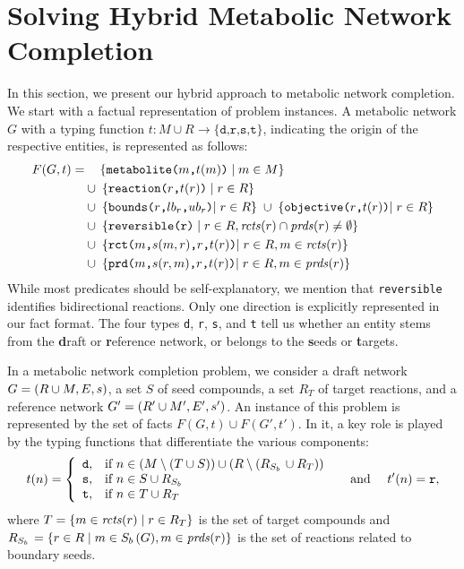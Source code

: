 
\section{Solving Hybrid Metabolic Network Completion}
\label{sec:approach}

In this section, we present our hybrid approach to metabolic network completion.
We start with a factual representation of problem instances.
%
A metabolic network $G$ with a typing function $t: M\cup R\rightarrow\{\texttt{d,r,s,t}\}$,
indicating the origin of the respective entities,
is represented as follows:
\begin{align*}
F(G,t) = & \phantom{\cup\;}\;\{\texttt{metabolite($m$,$t(m)$)}\mid m\in M\} \\
         &          \cup\;   \{\texttt{reaction($r$,$t(r)$)}\mid r\in R\}  \\
         &          \cup\;   \{\texttt{bounds($r$,$lb_r$,$ub_r$)$\mid r\in R$}\} \;\cup\; \{\texttt{objective($r$,$t(r)$)$\mid r\in R$}\}\\
         &          \cup\;   \{\texttt{reversible(r)}\mid r\in R, \mathit{rcts}(r)\cap\mathit{prds}(r)\neq\emptyset\} \\
         &          \cup\;   \{\texttt{rct($m$,$s(m,r)$,$r$,$t(r)$)$\mid r\in R, m\in\mathit{rcts}(r)$}\} \\
         &          \cup\;   \{\texttt{prd($m$,$s(r,m)$,$r$,$t(r)$)$\mid r\in R, m\in\mathit{prds}(r)$}\}
\end{align*}
%
While most predicates should be self-explanatory,
we mention that \texttt{reversible} identifies bidirectional reactions.
Only one direction is explicitly represented in our fact format.
%
The four types \texttt{d}, \texttt{r}, \texttt{s}, and \texttt{t} tell us whether an entity stems from the
\textbf{d}raft or \textbf{r}eference network, or belongs to the \textbf{s}eeds or \textbf{t}argets.

In a metabolic network completion problem,
we consider
a draft network  $G=(R\cup M,E,s)$,
a set $S$ of seed compounds, %
a set $R_{T}$ of target reactions,
and a reference network $G'=(R'\cup M',E',s')$.
%
An instance of this problem is represented by the set of facts
\(
F(G,t)\cup F(G',t')
\).
In it, a key role is played by the typing functions that differentiate the various components:
\[
  t(n) =
  \left\{
    \begin{array}{ll}
    \texttt{d}, & \text{if } n\in (M\setminus (T\cup S))\cup (R\setminus(R_{S_{b}\,}\cup R_T)) \\
    \texttt{s}, & \text{if } n\in S\cup R_{S_{b}\,} \\
    \texttt{t}, & \text{if } n\in T\cup R_T
  \end{array}
  \right.
  \quad\text{ and }\quad
  t'(n) = \texttt{r},
\]
where
\(
T=\{m\in\mathit{rcts}(r)\mid r\in R_T\}
\)
is the set of target compounds and
\(
R_{S_{b}\,}=\{r\in R\mid m\in S_{b}\,(G), m\in\mathit{prds}(r)\}
\)
is the set of reactions related to boundary seeds.

